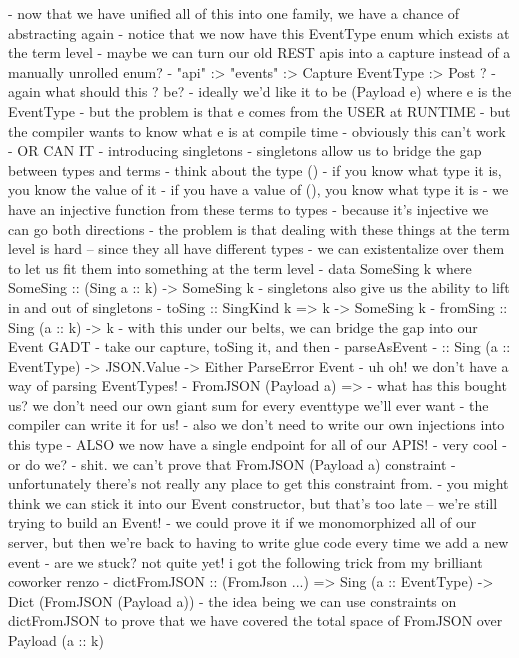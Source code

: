 - now that we have unified all of this into one family, we have a chance of abstracting again
  - notice that we now have this EventType enum which exists at the term level
  - maybe we can turn our old REST apis into a capture instead of a manually unrolled enum?
  - "api" :> "events" :> Capture EventType :> Post ?
    - again what should this ? be?
    - ideally we'd like it to be (Payload e) where e is the EventType
    - but the problem is that e comes from the USER at RUNTIME
    - but the compiler wants to know what e is at compile time
  - obviously this can't work
- OR CAN IT
  - introducing singletons
  - singletons allow us to bridge the gap between types and terms
  - think about the type ()
    - if you know what type it is, you know the value of it
    - if you have a value of (), you know what type it is
    - we have an injective function from these terms to types
      - because it's injective we can go both directions
  - the problem is that dealing with these things at the term level is hard -- since they all have different types
    - we can existentalize over them to let us fit them into something at the term level
    - data SomeSing k where SomeSing :: (Sing a :: k) -> SomeSing k
  - singletons also give us the ability to lift in and out of singletons
    - toSing :: SingKind k => k -> SomeSing k
    - fromSing :: Sing (a :: k) -> k
- with this under our belts, we can bridge the gap into our Event GADT
  - take our capture, toSing it, and then
  - parseAsEvent
    - :: Sing (a :: EventType) -> JSON.Value -> Either ParseError Event
  - uh oh! we don't have a way of parsing EventTypes!
    - FromJSON (Payload a) =>
- what has this bought us? we don't need our own giant sum for every eventtype we'll ever want
  - the compiler can write it for us!
  - also we don't need to write our own injections into this type
  - ALSO we now have a single endpoint for all of our APIS!
    - very cool
- or do we?
  - shit. we can't prove that FromJSON (Payload a) constraint
- unfortunately there's not really any place to get this constraint from.
  - you might think we can stick it into our Event constructor, but that's too late -- we're still trying to build an Event!
  - we could prove it if we monomorphized all of our server, but then we're back to having to write glue code every time we add a new event
- are we stuck? not quite yet! i got the following trick from my brilliant coworker renzo
  - dictFromJSON :: (FromJson ...) => Sing (a :: EventType) -> Dict (FromJSON (Payload a))
  - the idea being we can use constraints on dictFromJSON to prove that we have covered the total space of FromJSON over Payload (a :: k)
